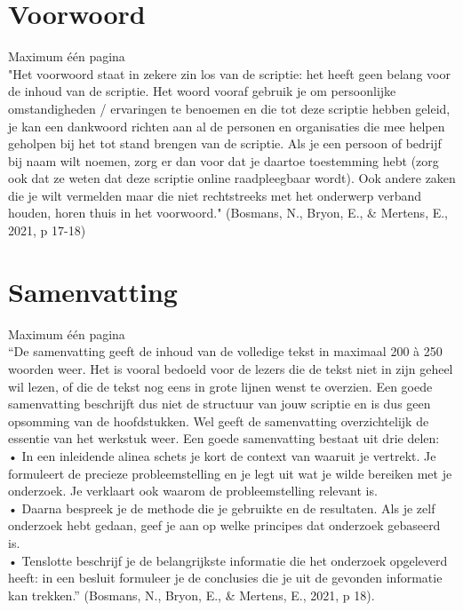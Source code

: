 \documentclass[a4paper, 11pt]{report}
\begin{document}
\begin{titlepage}
	
\end{titlepage}


\chapter*{Voorwoord}
\thispagestyle{empty}

Maximum één pagina
\\ "Het voorwoord staat in zekere zin los van de scriptie: het heeft geen belang voor de inhoud van de scriptie. Het woord vooraf gebruik je om persoonlijke omstandigheden / ervaringen te benoemen en die tot deze scriptie hebben geleid, je kan een dankwoord richten aan al de personen en organisaties die mee helpen geholpen bij het tot stand brengen van de scriptie. Als je een persoon of bedrijf bij naam wilt noemen, zorg er dan voor dat je daartoe toestemming hebt (zorg ook dat ze weten dat deze scriptie online raadpleegbaar wordt).
Ook andere zaken die je wilt vermelden maar die niet rechtstreeks met het onderwerp verband houden, horen thuis in het voorwoord." (Bosmans, N., Bryon, E., \& Mertens, E., 2021, p 17-18)


\chapter*{Samenvatting}
\thispagestyle{empty}

Maximum één pagina
\\ “De samenvatting geeft de inhoud van de volledige tekst in maximaal 200 à 250 woorden weer. Het is vooral bedoeld voor de lezers die de tekst niet in zijn geheel wil lezen, of die de tekst nog eens in grote lijnen wenst te overzien. Een goede samenvatting beschrijft dus niet de structuur van jouw scriptie en is dus geen opsomming van de hoofdstukken. Wel geeft de samenvatting overzichtelijk de essentie van het werkstuk weer.
Een goede samenvatting bestaat uit drie delen:
\\ • In een inleidende alinea schets je kort de context van waaruit je vertrekt. Je formuleert de precieze probleemstelling en je legt uit wat je wilde bereiken met je onderzoek. Je verklaart ook waarom de probleemstelling relevant is.
\\ • Daarna bespreek je de methode die je gebruikte en de resultaten. Als je zelf onderzoek hebt gedaan, geef je aan op welke principes dat onderzoek gebaseerd is.
\\ • Tenslotte beschrijf je de belangrijkste informatie die het onderzoek opgeleverd heeft: in een besluit formuleer je de conclusies die je uit de gevonden informatie kan trekken.”
(Bosmans, N., Bryon, E., \& Mertens, E., 2021, p 18).
\end{document}
